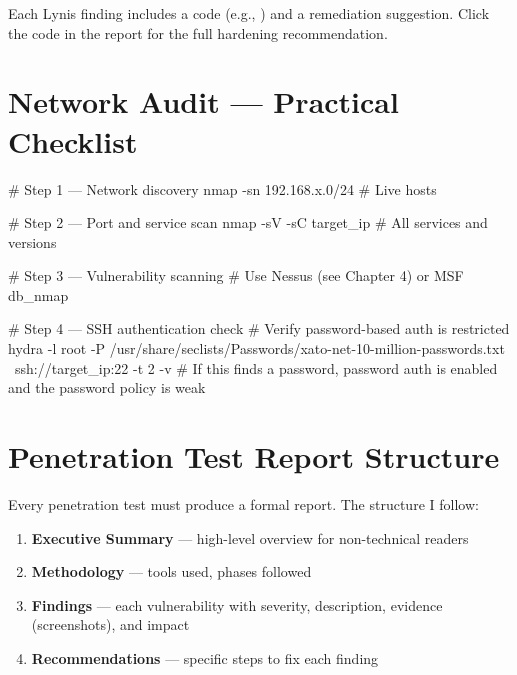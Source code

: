 \begin{notebox}

\begin{notebox}
Each Lynis finding includes a code (e.g., ) and a remediation
suggestion. Click the code in the report for the full hardening recommendation.
\end{notebox}

\section{Network Audit --- Practical Checklist}
\label{sec:network_audit}

\begin{termbox}
# Step 1 --- Network discovery
nmap -sn 192.168.x.0/24             # Live hosts

# Step 2 --- Port and service scan
nmap -sV -sC target_ip              # All services and versions

# Step 3 --- Vulnerability scanning
# Use Nessus (see Chapter 4) or MSF db_nmap

# Step 4 --- SSH authentication check
# Verify password-based auth is restricted
hydra -l root -P /usr/share/seclists/Passwords/xato-net-10-million-passwords.txt \
  ssh://target_ip:22 -t 2 -v
# If this finds a password, password auth is enabled and the password policy is weak
\end{termbox}

\section{Penetration Test Report Structure}
\label{sec:pentest_report}

Every penetration test must produce a formal report. The structure I follow:

\begin{enumerate}
  \item \textbf{Executive Summary} --- high-level overview for non-technical readers
  \item \textbf{Methodology} --- tools used, phases followed
  \item \textbf{Findings} --- each vulnerability with severity, description,
        evidence (screenshots), and impact
  \item \textbf{Recommendations} --- specific steps to fix each finding
\end{enumerate}


\end{notebox}
